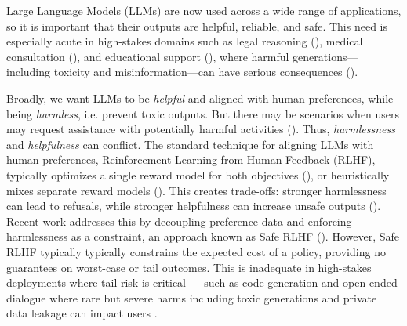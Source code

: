 
Large Language Models (LLMs) are now used across a wide range of applications, so it is important that their outputs are helpful, reliable, and safe. This need is especially acute in high-stakes domains such as legal reasoning (\cite{katz2024gpt}), medical consultation (\cite{yang2022large,moor2023foundation}), and educational support (\cite{kasneci2023chatgpt,kung2023performance}), where harmful generations—including toxicity and misinformation—can have serious consequences (\cite{gehman2020realtoxicityprompts,weidinger2021ethical,ganguli2022red}).

Broadly, we want LLMs to be \textit{helpful} and aligned with human preferences, while being \textit{harmless}, i.e. prevent toxic outputs. But there may be scenarios when users may request assistance with potentially harmful activities (\cite{Bai2022ConstitutionalAH,glaese2022improving}). Thus, \emph{harmlessness} and \emph{helpfulness} can conflict. The standard technique for aligning LLMs with human preferences, Reinforcement Learning from Human Feedback (RLHF), typically optimizes a single reward model for both objectives (\cite{Ouyang2022TrainingLM,bai2022traininghelpfulharmlessassistant}), or heuristically mixes separate reward models (\cite{glaese2022improving,touvron2023llama,mu2024rule}). This creates trade-offs: stronger harmlessness can lead to refusals, while stronger helpfulness can increase unsafe outputs (\cite{bai2022traininghelpfulharmlessassistant}). Recent work addresses this by decoupling preference data and enforcing harmlessness as a constraint, an approach known as Safe RLHF (\cite{dai2023safe}). However, Safe RLHF typically typically constrains the expected cost of a policy, providing no guarantees on worst-case or tail outcomes.  This is inadequate in high-stakes deployments where tail risk is critical — such as code generation \cite{pearce2021asleepkeyboardassessingsecurity} and open-ended dialogue where rare but severe harms including toxic generations and private data leakage can impact users
\citep{perez2022redteaminglanguagemodels, gehman2020realtoxicityprompts}.


